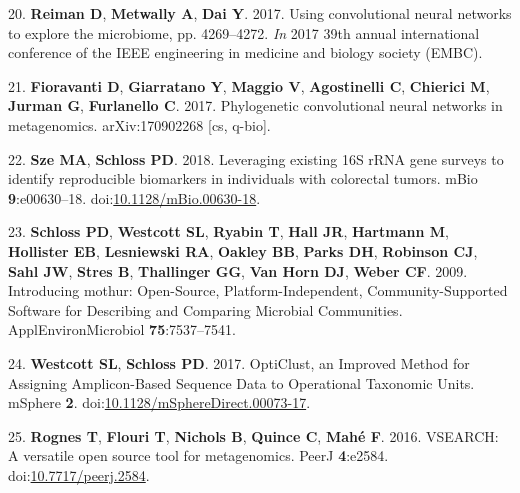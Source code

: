 \documentclass[11pt,]{article}
\begin{document}
\hypertarget{ref-reiman_using_2017}{}
20. \textbf{Reiman D}, \textbf{Metwally A}, \textbf{Dai Y}. 2017. Using
convolutional neural networks to explore the microbiome, pp. 4269--4272.
\emph{In} 2017 39th annual international conference of the IEEE
engineering in medicine and biology society (EMBC).

\hypertarget{ref-fioravanti_phylogenetic_2017}{}
21. \textbf{Fioravanti D}, \textbf{Giarratano Y}, \textbf{Maggio V},
\textbf{Agostinelli C}, \textbf{Chierici M}, \textbf{Jurman G},
\textbf{Furlanello C}. 2017. Phylogenetic convolutional neural networks
in metagenomics. arXiv:170902268 {[}cs, q-bio{]}.

\hypertarget{ref-sze_leveraging_2018}{}
22. \textbf{Sze MA}, \textbf{Schloss PD}. 2018. Leveraging existing 16S
rRNA gene surveys to identify reproducible biomarkers in individuals
with colorectal tumors. mBio \textbf{9}:e00630--18.
doi:\href{https://doi.org/10.1128/mBio.00630-18}{10.1128/mBio.00630-18}.

\hypertarget{ref-schloss_introducing_2009}{}
23. \textbf{Schloss PD}, \textbf{Westcott SL}, \textbf{Ryabin T},
\textbf{Hall JR}, \textbf{Hartmann M}, \textbf{Hollister EB},
\textbf{Lesniewski RA}, \textbf{Oakley BB}, \textbf{Parks DH},
\textbf{Robinson CJ}, \textbf{Sahl JW}, \textbf{Stres B},
\textbf{Thallinger GG}, \textbf{Van Horn DJ}, \textbf{Weber CF}. 2009.
Introducing mothur: Open-Source, Platform-Independent,
Community-Supported Software for Describing and Comparing Microbial
Communities. ApplEnvironMicrobiol \textbf{75}:7537--7541.

\hypertarget{ref-westcott_opticlust_2017}{}
24. \textbf{Westcott SL}, \textbf{Schloss PD}. 2017. OptiClust, an
Improved Method for Assigning Amplicon-Based Sequence Data to
Operational Taxonomic Units. mSphere \textbf{2}.
doi:\href{https://doi.org/10.1128/mSphereDirect.00073-17}{10.1128/mSphereDirect.00073-17}.

\hypertarget{ref-rognes_vsearch_2016}{}
25. \textbf{Rognes T}, \textbf{Flouri T}, \textbf{Nichols B},
\textbf{Quince C}, \textbf{Mahé F}. 2016. VSEARCH: A versatile open
source tool for metagenomics. PeerJ \textbf{4}:e2584.
doi:\href{https://doi.org/10.7717/peerj.2584}{10.7717/peerj.2584}.
\end{document}
